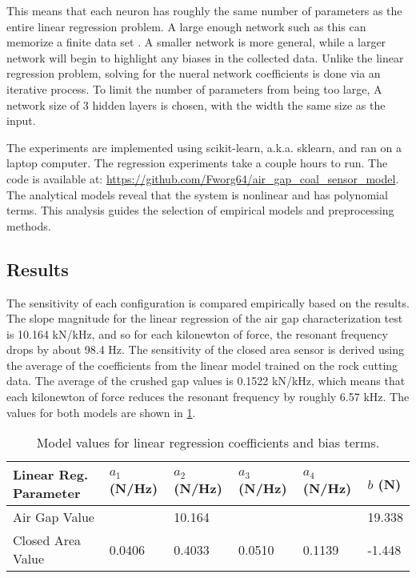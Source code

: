 This means that each neuron has roughly the same number of parameters as the entire linear regression problem.
A large enough network such as this can memorize a finite data set \cite{AroraBMM16}.
A smaller network is more general, while a larger network will begin to highlight any biases in the collected data.
Unlike the linear regression problem, solving for the nueral network coefficients is done via an iterative process.
To limit the number of parameters from being too large,
A network size of 3 hidden layers is chosen, with the width the same size as the input. 

The experiments are implemented using scikit-learn, a.k.a. sklearn, \cite{JMLR:v12:pedregosa11a} 
and ran on a laptop computer. The regression experiments take a couple hours to run.
The code is available at: \url{https://github.com/Fworg64/air_gap_coal_sensor_model}.
The analytical models reveal that the system is nonlinear and has polynomial terms.
This analysis guides the selection of empirical models and preprocessing methods.

\subsection{Results}

The sensitivity of each configuration is compared empirically based on the results.
The slope magnitude for the linear regression of the air gap characterization test is
10.164 kN/kHz, and so for each kilonewton of force, the resonant frequency drops by about
98.4 Hz. The sensitivity of the closed area sensor is derived using the average of the 
coefficients from the linear model trained on the rock cutting data.
The average of the crushed gap values is 0.1522 kN/kHz, which means that each kilonewton of force
reduces the resonant frequency by roughly 6.57 kHz.
The values for both models are shown in \ref{tab:lin}. 

\begin{table}[b]
\centering
\caption{Model values for linear regression coefficients and bias terms.}
\label{tab:lin}
\begin{tabular}{|l|l|l|l|l|l|} 
\hline
Linear Reg. Parameter & $a_1$ (N/Hz) & $a_2$ (N/Hz) & $a_3$ (N/Hz)  & $a_4$ (N/Hz) & $b$ (N)     \\ \hline
Air Gap Value         & & 10.164 &  &  &  19.338  \\ \hline
Closed Area Value             & 0.0406 & 0.4033 & 0.0510 & 0.1139 &  -1.448  \\ \hline
\end{tabular}
\end{table}

